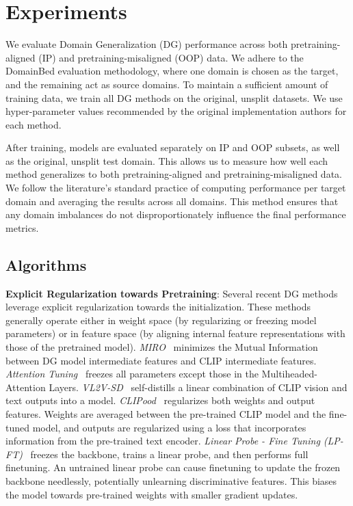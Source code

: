 \documentclass{article} %
\begin{document}
\section{Experiments}
\label{sec:benchmarking}
We evaluate Domain Generalization (DG) performance across both pretraining-aligned (IP) and pretraining-misaligned (OOP) data. We adhere to the DomainBed evaluation methodology, where one domain is chosen as the target, and the remaining act as source domains. To maintain a sufficient amount of training data, we train all DG methods on the original, unsplit datasets.  We use hyper-parameter values recommended by the original implementation authors for each method.

After training, models are evaluated separately on IP and OOP subsets, as well as the original, unsplit test domain.  This allows us to measure how well each method generalizes to both pretraining-aligned and pretraining-misaligned data. We follow the literature's standard practice of computing performance per target domain and averaging the results across all domains. This method ensures that any domain imbalances do not disproportionately influence the final performance metrics.



\subsection{Algorithms}
\textbf{Explicit Regularization towards Pretraining}: Several recent DG methods leverage explicit regularization towards the initialization. These methods generally operate either in weight space (by regularizing or freezing model parameters) or in feature space (by aligning internal feature representations with those of the pretrained model). \emph{MIRO}~\citep{cha2022miro}  minimizes the Mutual Information between DG model intermediate features and CLIP intermediate features. \emph{Attention Tuning}~\citep{teterwak2023erm++,touvron2022three}  freezes all parameters except those in the Multiheaded-Attention Layers. \emph{VL2V-SD}~\citep{addepalli2024leveraging} self-distills a linear combination of CLIP vision and text outputs into a model. \emph{CLIPood}~\citep{shu2023clipood} regularizes both weights and output features. Weights are averaged between the pre-trained CLIP model and the fine-tuned model, and outputs are regularized using a loss that incorporates  information from the pre-trained text encoder. \emph{Linear Probe - Fine Tuning (LP-FT)}~\citep{kumar2021fine} freezes the backbone, trains a linear probe, and then performs full finetuning. An untrained linear probe can cause finetuning to update the frozen backbone needlessly, potentially unlearning discriminative features. This biases the model towards pre-trained weights with smaller gradient updates.
\end{document}
